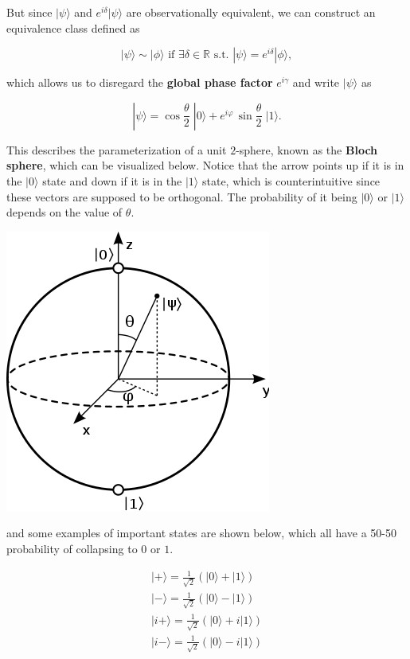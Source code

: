 \documentclass{article}
\theoremstyle{definition}
\begin{document}
        But since $|\psi \rangle$ and $e^{i \delta} |\psi \rangle$ are observationally equivalent, we can construct an equivalence class defined as

          \[|\psi\rangle \sim |\phi\rangle \text{ if } \exists \delta \in \mathbb{R} \text{ s.t. } |\psi \rangle = e^{i\delta} |\phi \rangle,\]

        which allows us to disregard the \textbf{global phase factor} $e^{i \gamma}$ and write $|\psi \rangle$ as

          \[|\psi \rangle = \cos \frac{\theta}{2} \; |0 \rangle + e^{i \varphi} \, \sin \frac{\theta}{2} \; |1 \rangle.\]

        This describes the parameterization of a unit $2$-sphere, known as the \textbf{Bloch sphere}, which can be visualized below. Notice that the arrow points up if it is in the $|0\rangle$ state and down if it is in the $|1\rangle$ state, which is counterintuitive since these vectors are supposed to be orthogonal. The probability of it being $|0\rangle$ or $|1\rangle$ depends on the value of $\theta$. 

        \begin{center}
          \includegraphics[scale=0.4]{img/330px-Bloch_sphere.png}
        \end{center}

        and some examples of important states are shown below, which all have a 50-50 probability of collapsing to $0$ or $1$. 

        \begin{align*} 
          |+\rangle = \frac{1}{\sqrt{2}} (|0\rangle + |1\rangle) \\ 
          |-\rangle = \frac{1}{\sqrt{2}} (|0\rangle - |1\rangle) \\ 
          |i+\rangle = \frac{1}{\sqrt{2}} (|0\rangle + i|1\rangle) \\ 
          |i-\rangle = \frac{1}{\sqrt{2}} (|0\rangle - i|1\rangle) \\ 
        \end{align*}
\end{document}
